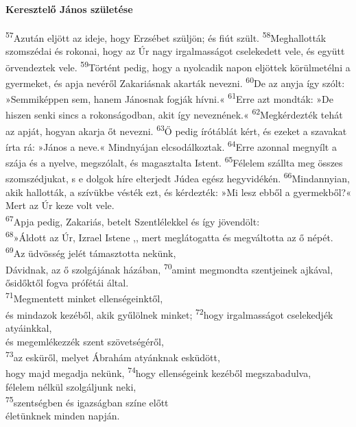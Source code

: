 \documentclass[10pt]{article}
\begin{document}
\begin{multicols}{2}
\paragraph*{Keresztelő János születése}
\textsuperscript{57}Azután eljött az ideje, hogy Erzsébet szüljön; és fiút szült.  
\textsuperscript{58}Meghallották szomszédai és rokonai, hogy az Úr nagy irgalmasságot cselekedett vele, és együtt örvendeztek vele.  
\textsuperscript{59}Történt pedig, hogy a nyolcadik napon eljöttek körülmetélni a gyermeket, és apja nevéről Zakariásnak akarták nevezni.  
\textsuperscript{60}De az anyja így szólt: »Semmiképpen sem, hanem Jánosnak fogják hívni.«  
\textsuperscript{61}Erre azt mondták: »De hiszen senki sincs a rokonságodban, akit így neveznének.«  
\textsuperscript{62}Megkérdezték tehát az apját, hogyan akarja őt nevezni.  
\textsuperscript{63}Ő pedig írótáblát kért, és ezeket a szavakat írta rá: »János a neve.« Mindnyájan elcsodálkoztak.  
\textsuperscript{64}Erre azonnal megnyílt a szája és a nyelve, megszólalt, és magasztalta Istent.  
\textsuperscript{65}Félelem szállta meg összes szomszédjukat, s e dolgok híre elterjedt Júdea egész hegyvidékén.  
\textsuperscript{66}Mindannyian, akik hallották, a szívükbe vésték ezt, és kérdezték: »Mi lesz ebből a gyermekből?« Mert az Úr keze volt vele. \\  
\textsuperscript{67}Apja pedig, Zakariás, betelt Szentlélekkel és így jövendölt: \\  
\textsuperscript{68}»Áldott az Úr, Izrael Istene ,, mert meglátogatta és megváltotta az ő népét. \\  
\textsuperscript{69}Az üdvösség jelét támasztotta nekünk, \\ Dávidnak, az ő szolgájának házában,  
\textsuperscript{70}amint megmondta szentjeinek ajkával, \\ ősidőktől fogva prófétái által. \\  
\textsuperscript{71}Megmentett minket ellenségeinktől, \\ és mindazok kezéből, akik gyűlölnek minket;  
\textsuperscript{72}hogy irgalmasságot cselekedjék atyáinkkal, \\ és megemlékezzék szent szövetségéről, \\  
\textsuperscript{73}az esküről, melyet Ábrahám atyánknak esküdött, \\ hogy majd megadja nekünk,  
\textsuperscript{74}hogy ellenségeink kezéből megszabadulva, \\ félelem nélkül szolgáljunk neki, \\  
\textsuperscript{75}szentségben és igazságban színe előtt \\ életünknek minden napján. \\  

\end{multicols}
\end{document}
